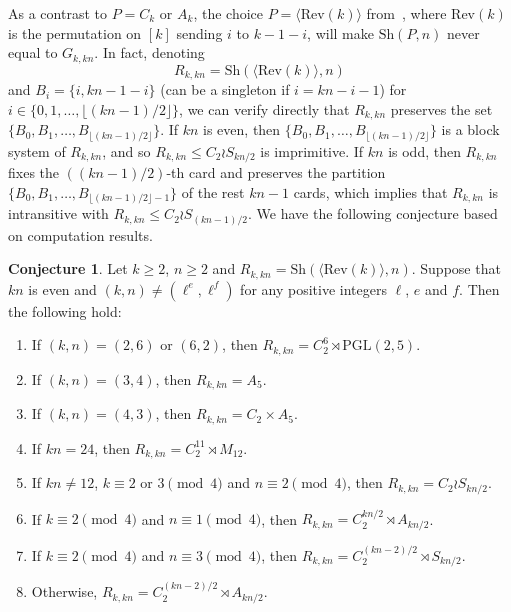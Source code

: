 \documentclass[11pt,a4paper,reqno]{amsart}
\newcommand{\PGL}{\mathrm{PGL}}
\newcommand{\Sh}{\mathrm{Sh}}
\theoremstyle{definition}
\newtheorem{conjecture}[theorem]{Conjecture}
\begin{document}
As a contrast to $P=C_k$ or $A_k$, the choice $P=\langle \mathrm{Rev}(k)\rangle$ from~\cite[Page~6]{MM1987}, where $\mathrm{Rev}(k)$ is the permutation on $[k]$ sending $i$ to $k-1-i$, will make $\Sh(P,n)$ never equal to $G_{k,kn}$. In fact, denoting
\[
  R_{k,kn}=\Sh(\langle \mathrm{Rev}(k)\rangle,n)
\]
and $B_i=\{i,kn-1-i\}$ (can be a singleton if $i=kn-i-1$) for $i\in\{0,1,\ldots, \lfloor (kn-1)/2 \rfloor\}$, we can verify directly  that $R_{k,kn}$ preserves the set $\{B_0,B_1,\ldots,B_{\lfloor (kn-1)/2 \rfloor}\}$. If $kn$ is even, then $\{B_0,B_1,\ldots,B_{\lfloor (kn-1)/2 \rfloor}\}$ is a block system of $R_{k,kn}$, and so $R_{k,kn}\leq C_2\wr S_{kn/2}$ is imprimitive. If $kn$ is odd, then $R_{k,kn}$ fixes the $((kn-1)/2)$-th card and preserves the partition $\{B_0,B_1,\ldots,B_{\lfloor (kn-1)/2 \rfloor-1}\}$ of the rest $kn-1$ cards, which implies that $R_{k,kn}$ is intransitive with $R_{k,kn}\leq C_2\wr S_{(kn-1)/2}$. We have the following conjecture based on computation results.

\begin{conjecture}\label{conj:rev}
  Let $k\geq 2$, $n\geq 2$ and $R_{k,kn}=\Sh(\langle \mathrm{Rev}(k)\rangle,n)$. Suppose that $kn$ is even and $(k,n)\neq (\ell^e,\ell^f)$ for any positive integers $\ell$, $e$ and $f$. Then the following hold:
\begin{enumerate}[\rm(a)]
  \item If $(k,n)=(2,6)$ or $(6,2)$, then $R_{k,kn}=C_2^6\rtimes \PGL(2,5)$.
  \item If $(k,n)=(3,4)$, then $R_{k,kn}=A_5$.
  \item If $(k,n)=(4,3)$, then $R_{k,kn}=C_2\times A_5$.
  \item If $kn=24$, then $R_{k,kn}=C_2^{11}\rtimes M_{12}$.
  \item If $kn\neq 12$, $k\equiv 2$ or $3\pmod{4}$ and $n\equiv 2\pmod{4}$, then  $R_{k,kn}=C_2\wr S_{kn/2}$.
  \item If $k\equiv 2\pmod{4}$ and $n\equiv 1\pmod{4}$, then $R_{k,kn}=C_2^{ kn/2}\rtimes A_{ kn/2}$.
  \item If $k\equiv 2\pmod{4}$ and $n\equiv 3\pmod{4}$, then $R_{k,kn}=C_2^{ (kn-2)/2}\rtimes S_{kn/2}$.
  \item Otherwise, $R_{k,kn}=C_2^{ (kn-2)/2}\rtimes A_{ kn/2}$.
\end{enumerate}
\end{conjecture}
\end{document}
